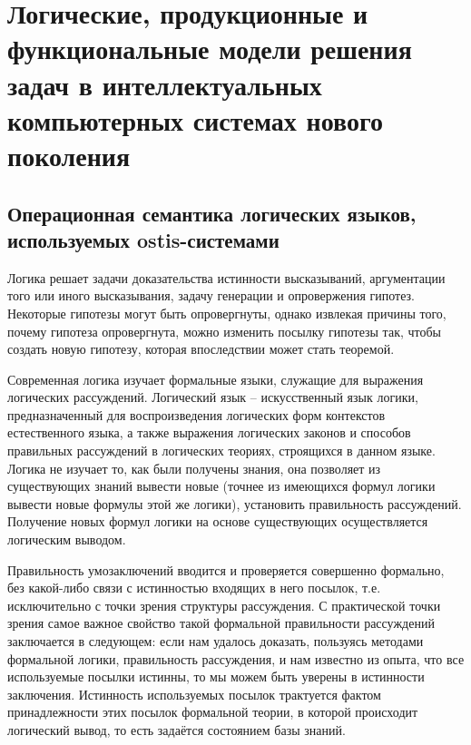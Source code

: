 \chapter{Логические, продукционные и функциональные модели решения задач в интеллектуальных компьютерных системах нового поколения}
\label{chapter_logic_productions}


\section{Операционная семантика логических языков, используемых ostis-системами}


Логика решает задачи доказательства истинности высказываний, аргументации того или иного высказывания, задачу генерации и опровержения гипотез. Некоторые гипотезы могут быть опровергнуты, однако извлекая причины того, почему гипотеза опровергнута, можно изменить посылку гипотезы так, чтобы создать новую гипотезу, которая впоследствии может стать теоремой.

Современная логика изучает формальные языки, служащие для выражения логических рассуждений.
Логический язык -- искусственный язык логики, предназначенный для воспроизведения логических форм контекстов естественного языка, а также выражения логических законов и способов правильных рассуждений в логических теориях, строящихся в данном языке. Логика не изучает то, как были получены знания, она позволяет из существующих знаний вывести новые (точнее из имеющихся формул логики вывести новые формулы этой же логики), установить правильность рассуждений. Получение новых формул логики на основе существующих осуществляется логическим выводом.

Правильность умозаключений вводится и проверяется совершенно формально, без какой-либо связи с истинностью входящих в него посылок, т.е. исключительно с точки зрения структуры рассуждения. С практической точки зрения самое важное свойство такой формальной правильности рассуждений заключается в следующем: если нам удалось доказать, пользуясь методами формальной логики, правильность рассуждения, и нам известно из опыта, что все используемые посылки истинны, то мы можем быть уверены в истинности заключения. Истинность используемых посылок трактуется фактом принадлежности этих посылок формальной теории, в которой происходит логический вывод, то есть задаётся состоянием базы знаний.


